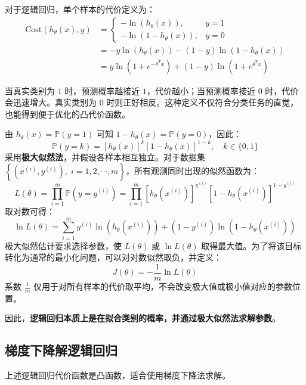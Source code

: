 对于逻辑回归，单个样本的代价定义为：
\begin{align*}
\text{Cost}\left(h_\theta(x),y\right)&=\begin{cases}-\ln(h_\theta(x)),&y=1\\-\ln(1-h_\theta(x)),&y=0\end{cases}\\
&=-y\ln(h_\theta(x))-(1-y)\ln(1-h_\theta(x))\\
&=y\ln\left(1+e^{-\theta^Tx}\right)+(1-y)\ln\left(1+e^{\theta^Tx}\right)
\end{align*}

当真实类别为 $1$ 时，预测概率越接近 $1$，代价越小；当预测概率接近 $0$ 时，代价会迅速增大。真实类别为 $0$ 时则正好相反。这种定义不仅符合分类任务的直觉，也能得到便于优化的凸代价函数。

\begin{remark}[上式的来源]
由 $h_\theta(x)=\mathbb P(y=1)$ 可知 $1-h_\theta(x)=\mathbb P(y=0)$，因此：
\[
\mathbb P(y=k)=[h_\theta(x)]^k[1-h_\theta(x)]^{1-k},\quad k\in\{0,1\}
\]
采用\textbf{极大似然法}，并假设各样本相互独立。对于数据集 $\left\{\left(x^{(i)},y^{(i)}\right),\;i=1,2,\cdots,m\right\}$，所有观测同时出现的似然函数为：
\[
L(\theta)=\prod_{i=1}^m\mathbb P\left(y=y^{(i)}\right)=\prod_{i=1}^m\left[h_\theta(x^{(i)})\right]^{y^{(i)}}\left[1-h_\theta(x^{(i)})\right]^{1-y^{(i)}}
\]
取对数可得：
\[
\ln L(\theta)=\sum_{i=1}^my^{(i)}\ln(h_\theta(x^{(i)}))+(1-y^{(i)})\ln(1-h_\theta(x^{(i)}))
\]
极大似然估计要求选择参数，使 $L(\theta)$ 或 $\ln L(\theta)$ 取得最大值。为了将该目标转化为通常的最小化问题，可以对对数似然取负，并定义：
\[
J(\theta)=-\frac{1}{m}\ln L(\theta)
\]
系数 $\frac{1}{m}$ 仅用于对所有样本的代价取平均，不会改变极大值或极小值对应的参数位置。

因此，\textbf{逻辑回归本质上是在拟合类别的概率，并通过极大似然法求解参数}。
\end{remark}


\subsection{梯度下降解逻辑回归}

上述逻辑回归代价函数是凸函数，适合使用梯度下降法求解。

